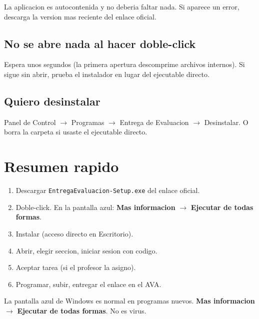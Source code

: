 \documentclass[11pt,a4paper,oneside]{report}
\begin{document}
La aplicacion es autocontenida y no deberia faltar nada. Si aparece un error,
descarga la version mas reciente del enlace oficial.

\section{No se abre nada al hacer doble-click}

Espera unos segundos (la primera apertura descomprime archivos internos).
Si sigue sin abrir, prueba el instalador en lugar del ejecutable directo.

\section{Quiero desinstalar}

Panel de Control $\rightarrow$ Programas $\rightarrow$ Entrega de Evaluacion
$\rightarrow$ Desinstalar. O borra la carpeta si usaste el ejecutable directo.

\chapter{Resumen rapido}

\begin{enumerate}
  \item Descargar \texttt{EntregaEvaluacion-Setup.exe} del enlace oficial.
  \item Doble-click. En la pantalla azul: \textbf{Mas informacion}
    $\rightarrow$ \textbf{Ejecutar de todas formas}.
  \item Instalar (acceso directo en Escritorio).
  \item Abrir, elegir seccion, iniciar sesion con codigo.
  \item Aceptar tarea (si el profesor la asigno).
  \item Programar, subir, entregar el enlace en el AVA.
\end{enumerate}

\begin{successbox}[Recuerda]
La pantalla azul de Windows es normal en programas nuevos. \textbf{Mas
informacion} $\rightarrow$ \textbf{Ejecutar de todas formas}. No es virus.
\end{successbox}
\end{document}
